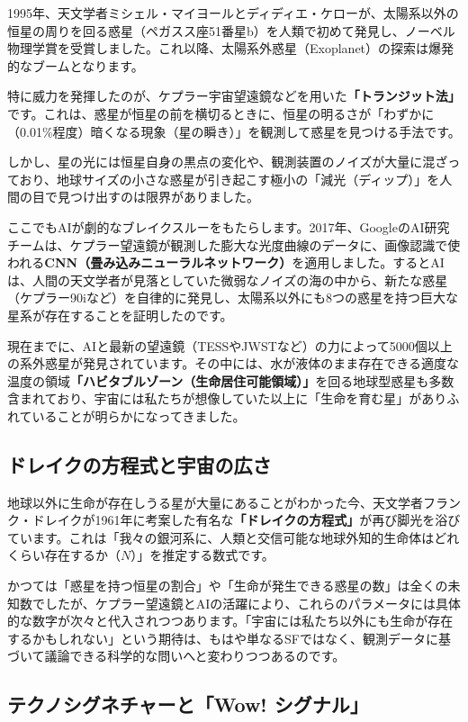 1995年、天文学者ミシェル・マイヨールとディディエ・ケローが、太陽系以外の恒星の周りを回る惑星（ペガスス座51番星b）を人類で初めて発見し、ノーベル物理学賞を受賞しました。これ以降、太陽系外惑星（Exoplanet）の探索は爆発的なブームとなります。

特に威力を発揮したのが、ケプラー宇宙望遠鏡などを用いた\textbf{「トランジット法」}です。これは、惑星が恒星の前を横切るときに、恒星の明るさが「わずかに（0.01\%程度）暗くなる現象（星の瞬き）」を観測して惑星を見つける手法です。

しかし、星の光には恒星自身の黒点の変化や、観測装置のノイズが大量に混ざっており、地球サイズの小さな惑星が引き起こす極小の「減光（ディップ）」を人間の目で見つけ出すのは限界がありました。

ここでもAIが劇的なブレイクスルーをもたらします。2017年、GoogleのAI研究チームは、ケプラー望遠鏡が観測した膨大な光度曲線のデータに、画像認識で使われる\textbf{CNN（畳み込みニューラルネットワーク）}を適用しました。するとAIは、人間の天文学者が見落としていた微弱なノイズの海の中から、新たな惑星（ケプラー90iなど）を自律的に発見し、太陽系以外にも8つの惑星を持つ巨大な星系が存在することを証明したのです。

現在までに、AIと最新の望遠鏡（TESSやJWSTなど）の力によって5000個以上の系外惑星が発見されています。その中には、水が液体のまま存在できる適度な温度の領域\textbf{「ハビタブルゾーン（生命居住可能領域）」}を回る地球型惑星も多数含まれており、宇宙には私たちが想像していた以上に「生命を育む星」がありふれていることが明らかになってきました。

\subsection{ドレイクの方程式と宇宙の広さ}

地球以外に生命が存在しうる星が大量にあることがわかった今、天文学者フランク・ドレイクが1961年に考案した有名な\textbf{「ドレイクの方程式」}が再び脚光を浴びています。これは「我々の銀河系に、人類と交信可能な地球外知的生命体はどれくらい存在するか（\(N\)）」を推定する数式です。

かつては「惑星を持つ恒星の割合」や「生命が発生できる惑星の数」は全くの未知数でしたが、ケプラー望遠鏡とAIの活躍により、これらのパラメータには具体的な数字が次々と代入されつつあります。「宇宙には私たち以外にも生命が存在するかもしれない」という期待は、もはや単なるSFではなく、観測データに基づいて議論できる科学的な問いへと変わりつつあるのです。

\subsection{テクノシグネチャーと「Wow! シグナル」}

